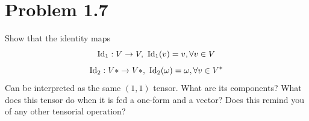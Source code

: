 \documentclass[12pt,a4paper]{article}
\begin{document}
	\section*{
		Problem 1.7
	}
	\begin{problem}
		Show that the identity maps
		\begin{equation}
			\label{eq:Id1}
		    \operatorname{Id}_1 : V\to V,\ \operatorname{Id}_1(v)= v, \forall v\in V
		\end{equation}
		\begin{equation}
			\label{eq:Id2}
			\operatorname{Id}_2 : V*\to V*,\ \operatorname{Id}_2(\omega)= \omega, \forall v\in V^*
		\end{equation}
		Can be interpreted as the same $(1,1)$ tensor. What are its components?
		What does this tensor do when it is fed a one-form and a vector? 
		Does this remind you of any other tensorial operation?
	\end{problem}
\end{document}
